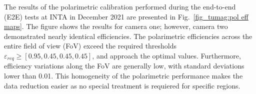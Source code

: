The results of the polarimetric calibration performed during the end-to-end (E2E) tests at INTA in December 2021 are presented in Fig.~\ref{fig_tumag:pol eff maps}. The figure shows the results for camera one; however, camera two demonstrated nearly identical efficiencies. The polarimetric efficiencies across the entire field of view (FoV) exceed the required thresholds $\varepsilon _{req} \geqslant [0.95, 0.45, 0.45, 0.45]$, and approach the optimal values. Furthermore, efficiency variations along the FoV are generally low, with standard deviations lower than 0.01. This homogeneity of the polarimetric performance makes the data reduction easier as no special treatment is requiered for specific regions.  